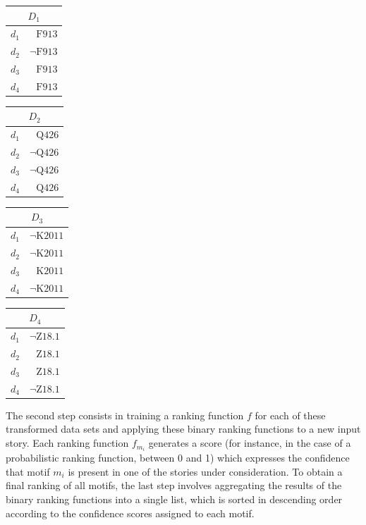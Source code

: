 \begin{table}[h]
\centering
\begin{tabular}{lr}
\multicolumn{2}{c}{$D_1$} \\
\toprule
$d_1$ & $\text{F913}$\\
$d_2$ & $\neg{\text{F913}}$\\
$d_3$ & $\text{F913}$\\
$d_4$ & $\text{F913}$\\
\bottomrule
\end{tabular}
\quad
\begin{tabular}{lr}
\multicolumn{2}{c}{$D_2$} \\
\toprule
$d_1$ & $\text{Q426}$ \\
$d_2$ & $\neg{\text{Q426}}$ \\
$d_3$ & $\neg{\text{Q426}}$ \\
$d_4$ & $\text{Q426}$ \\
\bottomrule
\end{tabular}
\quad
\begin{tabular}{lr}
\multicolumn{2}{c}{$D_3$} \\
\toprule
$d_1$ & $\neg{\text{K2011}}$\\
$d_2$ & $\neg{\text{K2011}}$\\
$d_3$ & $\text{K2011}$\\
$d_4$ & $\neg{\text{K2011}}$\\
\bottomrule
\end{tabular}
\quad
\begin{tabular}{lr}
\multicolumn{2}{c}{$D_4$} \\
\toprule
$d_1$ & $\neg{\text{Z18.1}}$ \\
$d_2$ & $\text{Z18.1}$ \\
$d_3$ & $\text{Z18.1}$ \\
$d_4$ & $\neg{\text{Z18.1}}$ \\
\bottomrule
\end{tabular}
\end{table}

The second step consists in training a ranking function $f$ for each of these transformed data sets and applying these binary ranking functions to a new input story. Each ranking function $f_{m_i}$ generates a score (for instance, in the case of a probabilistic ranking function, between 0 and 1) which expresses the confidence that motif $m_i$ is present in one of the stories under consideration. To obtain a final ranking of all motifs, the last step involves aggregating the results of the binary ranking functions into a single list, which is sorted in descending order according to the confidence scores assigned to each motif.

